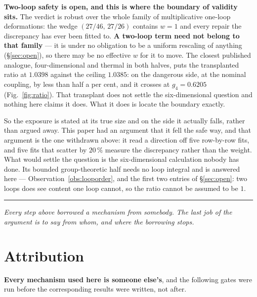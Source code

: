 \documentclass[11pt,a4paper]{article}
\newcommand{\bridge}[1]{\par\medskip\noindent
  \textcolor{hdrblue!45}{\rule{2.2cm}{0.6pt}}\;\;\parbox[t]{0.84\textwidth}{\small\itshape
  \textcolor{hdrblue!85}{#1}}\par\medskip}
\newenvironment{keyeq}
  {\begin{center}\setlength{\fboxsep}{9pt}\setlength{\fboxrule}{0.8pt}%
   \begin{lrbox}{\keyeqbox}\begin{minipage}{0.88\textwidth}}
  {\end{minipage}\end{lrbox}%
   \fcolorbox{hdrblue!55}{hdrblue!6}{\usebox{\keyeqbox}}\end{center}}
\begin{document}
\begin{keyeq}
\textbf{Two-loop safety is open, and this is where the boundary of validity sits.} The verdict is
robust over the whole family of multiplicative one-loop deformations: the wedge $(27/46,\,27/26)$
contains $w=1$ and every repair the discrepancy has ever been fitted to. \textbf{A two-loop term
need not belong to that family} --- it is under no obligation to be a uniform rescaling of anything
(\S\ref{sec:open}), so there may be no effective $w$ for it to move. The closest published analogue,
four-dimensional and thermal in both halves, puts the transplanted ratio at $1.0398$ against the
ceiling $1.0385$: on the dangerous side, at the nominal coupling, by less than half a per cent, and
it crosses at $g_4=0.6205$ (Fig.~\ref{fig:ratio}). That
transplant does not settle the six-dimensional question and nothing here claims it does. What it
does is locate the boundary exactly.
\end{keyeq}

\noindent
So the exposure is stated at its true size and on the side it actually falls, rather than argued
away. This paper had an argument that it fell the safe way, and that argument is the one withdrawn
above: it read a direction off five row-by-row fits, and five fits that scatter by $20\,\%$ measure
the discrepancy rather than the weight. What would settle the question is the six-dimensional
calculation nobody has done. Its bounded group-theoretic half needs no loop integral and is answered
here --- Observation~\ref{obs:looporder}, and the first two entries of \S\ref{sec:open}: two loops
does see content one loop cannot, so the ratio cannot be assumed to be $1$.

\bridge{Every step above borrowed a mechanism from somebody. The last job of the argument is to say
from whom, and where the borrowing stops.}

\section{Attribution}\label{sec:scope}

\textbf{Every mechanism used here is someone else's}, and the following gates were run before the
corresponding results were written, not after.
\end{document}
